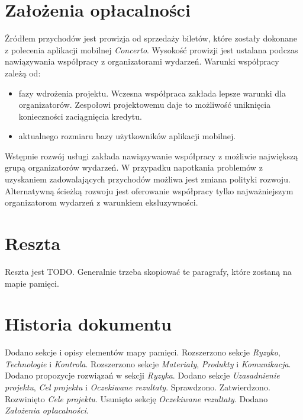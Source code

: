 \documentclass[10pt]{dokument-ppi}
\begin{document}
\section{Założenia opłacalności}

Źródłem przychodów jest prowizja od sprzedaży biletów, które zostały dokonane z
polecenia aplikacji mobilnej \emph{Concerto}. Wysokość prowizji jest ustalana
podczas nawiązywania współpracy z organizatorami wydarzeń. Warunki współpracy
zależą od:
\begin{itemize}
    \item fazy wdrożenia projektu. Wczesna współpraca zakłada lepsze warunki
        dla organizatorów. Zespołowi projektowemu daje to możliwość uniknięcia
        konieczności zaciągnięcia kredytu.
    \item aktualnego rozmiaru bazy użytkowników aplikacji mobilnej.
\end{itemize}
Wstępnie rozwój usługi zakłada nawiązywanie współpracy z możliwie największą
grupą organizatorów wydarzeń. W przypadku napotkania problemów z uzyskaniem
zadowalających przychodów możliwa jest zmiana polityki rozwoju. Alternatywną
ścieżką rozwoju jest oferowanie współpracy tylko najważniejszym organizatorom
wydarzeń z warunkiem eksluzywności.


\section{Reszta}

Reszta jest \textsc{TODO}. Generalnie trzeba skopiować te paragrafy, które
zostaną na mapie pamięci.

\newpage
\section*{Historia dokumentu}
\begin{versions}
        Dodano sekcje i opisy elementów mapy pamięci.
        Rozszerzono sekcje \emph{Ryzyko}, \emph{Technologie} i \emph{Kontrola}.
        Rozszerzono sekcje \emph{Materiały}, \emph{Produkty} i \emph{Komunikacja}.
        Dodano propozycje rozwiązań w sekcji \emph{Ryzyka}.
        Dodano sekcje \emph{Uzasadnienie projektu}, \emph{Cel projektu} i
        \emph{Oczekiwane rezultaty}.
        Sprawdzono.
        Zatwierdzono.
        Rozwinięto \emph{Cele projektu}. Usunięto sekcję \emph{Oczekiwane
        rezultaty}. Dodano \emph{Założenia opłacalności}.
\end{versions}
\end{document}
